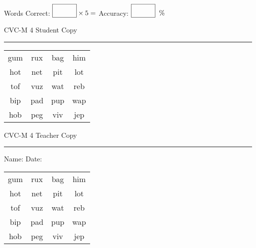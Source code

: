 \documentclass{memoir}
\begin{document}
\small

Words Correct: $\fbox{\phantom{\huge 100}} \times 5 = $ Accuracy: $\fbox{\phantom{\huge 100}}\;\; \%$ 

\vfill

\newpage


\footnotesize \noindent
CVC-M 4 \hfill Student Copy
\smallskip
\hrule

\Large

\setlength{\tabcolsep}{14pt}
\def\arraystretch{2}

{\selectfont


\begin{vplace}[0.5]
\begin{center}
\begin{tabular}{cccc}
gum  & rux & bag & him \\
hot & net & pit & lot \\
tof & vuz & wat & reb \\
bip & pad & pup & wap \\
hob & peg & viv & jep \\
\end{tabular}
\end{center}
\end{vplace}

}

\newpage

\footnotesize \noindent
CVC-M 4 \hfill Teacher Copy
\smallskip
\hrule

\small

\vfill

\noindent
Name: \underline{\hspace{1.75in}} \hfill Date: \underline{\hspace{1in}}

\Large

{\selectfont


\begin{vplace}[0.5]
\begin{center}
\begin{tabular}{cccc}
gum  & rux & bag & him \\
hot & net & pit & lot \\
tof & vuz & wat & reb \\
bip & pad & pup & wap \\
hob & peg & viv & jep \\
\end{tabular}
\end{center}
\end{vplace}



}
\end{document}
